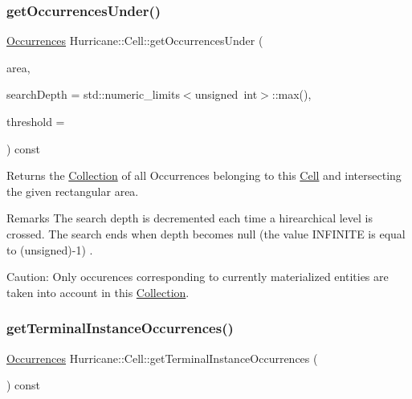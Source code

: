 \subsubsection{\texorpdfstring{get\+Occurrences\+Under()}{getOccurrencesUnder()}}
{\footnotesize\ttfamily \mbox{\hyperlink{namespaceHurricane_a1912927c128eee859af62dbe4cbe0a6b}{Occurrences}} Hurricane\+::\+Cell\+::get\+Occurrences\+Under (\begin{DoxyParamCaption}\item[{const \mbox{\hyperlink{classHurricane_1_1Box}{Box}} \&}]{area,  }\item[{unsigned}]{search\+Depth = {\ttfamily std\+:\+:numeric\+\_\+limits$<$unsigned~int$>$\+:\+:max()},  }\item[{\mbox{\hyperlink{group__DbUGroup_ga4fbfa3e8c89347af76c9628ea06c4146}{Db\+U\+::\+Unit}}}]{threshold = {} }\end{DoxyParamCaption}) const}

Returns the \mbox{\hyperlink{classHurricane_1_1Collection}{Collection}} of all Occurrences belonging to this \mbox{\hyperlink{classHurricane_1_1Cell}{Cell}} and intersecting the given rectangular area.

\begin{DoxyRemark}{Remarks}
The search depth is decremented each time a hirearchical level is crossed. The search ends when depth becomes null (the value {\ttfamily I\+N\+F\+I\+N\+I\+TE} is equal to {\ttfamily }(unsigned)-\/1) .
\end{DoxyRemark}
\begin{DoxyParagraph}{Caution\+: Only occurences corresponding to currently materialized}
entities are taken into account in this \mbox{\hyperlink{classHurricane_1_1Collection}{Collection}}. 
\end{DoxyParagraph}
\mbox{\label{classHurricane_1_1Cell_a30b71d9a35ff4e0b59b98ef515f26fc0}} 
\subsubsection{\texorpdfstring{get\+Terminal\+Instance\+Occurrences()}{getTerminalInstanceOccurrences()}}
{\footnotesize\ttfamily \mbox{\hyperlink{namespaceHurricane_a1912927c128eee859af62dbe4cbe0a6b}{Occurrences}} Hurricane\+::\+Cell\+::get\+Terminal\+Instance\+Occurrences (\begin{DoxyParamCaption}{ }\end{DoxyParamCaption}) const}

